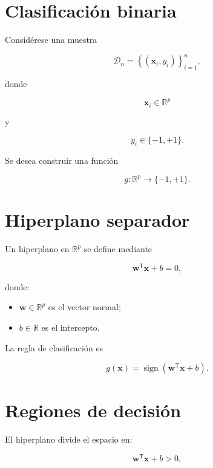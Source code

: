 \documentclass[
  spanish,
  10.5pt,
  letterpaper,
  DIV=11,
  numbers=noendperiod,
  oneside,
  open=any]{scrreprt}
\providecommand{\tightlist}{%
  \setlength{\itemsep}{0pt}\setlength{\parskip}{0pt}}
\theoremstyle{definition}
\theoremstyle{definition}
\theoremstyle{plain}
\theoremstyle{remark}
\begin{document}
\section*{Clasificación binaria}\label{clasificaciuxf3n-binaria-1}


Considérese una muestra

\[
\mathcal{D}_n
=
\left\{
(\mathbf{x}_i,y_i)
\right\}_{i=1}^{n},
\]

donde

\[
\mathbf{x}_i\in\mathbb{R}^{p}
\]

y

\[
y_i\in\{-1,+1\}.
\]

Se desea construir una función

\[
g:\mathbb{R}^{p}\to\{-1,+1\}.
\]

\section*{Hiperplano separador}\label{hiperplano-separador}


Un hiperplano en \(\mathbb{R}^{p}\) se define mediante

\[
\mathbf{w}^{\mathsf T}\mathbf{x}+b=0,
\]

donde:

\begin{itemize}
\tightlist
\item
  \(\mathbf{w}\in\mathbb{R}^{p}\) es el vector normal;
\item
  \(b\in\mathbb{R}\) es el intercepto.
\end{itemize}

La regla de clasificación es

\[
g(\mathbf{x})
=
\operatorname{sign}
\left(
\mathbf{w}^{\mathsf T}\mathbf{x}+b
\right).
\]

\section*{Regiones de decisión}\label{regiones-de-decisiuxf3n-1}


El hiperplano divide el espacio en:

\[
\mathbf{w}^{\mathsf T}\mathbf{x}+b>0,
\]
\end{document}
